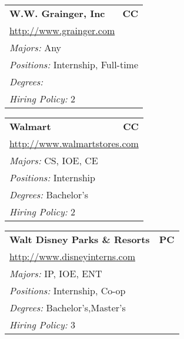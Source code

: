 \documentclass[twoside]{article}
\begin{document}
\begin{center}
\begin{multicols}{3}
\begin{FlushLeft}
\begin{minipage}{.9\columnwidth}
\end{minipage}
 
\begin{minipage}{.9\columnwidth}\begin{tabularx}{.95\columnwidth}{Xr}
                 {\Large\bf W.W. Grainger, Inc} & {\Large\bf CC}\\
    \multicolumn{2}{p{.95\columnwidth}}{\url{http://www.grainger.com}}\\
    \multicolumn{2}{p{.95\columnwidth}}{\emph{Majors:} Any}\\
    \multicolumn{2}{p{.95\columnwidth}}{\emph{Positions:} Internship, Full-time}\\
    \multicolumn{2}{p{.95\columnwidth}}{\emph{Degrees:} }\\
    \multicolumn{2}{p{.95\columnwidth}}{\emph{Hiring Policy:} 2}\\
    \end{tabularx}
    
\end{minipage}
 
\begin{minipage}{.9\columnwidth}\begin{tabularx}{.95\columnwidth}{Xr}
                 {\Large\bf Walmart} & {\Large\bf CC}\\
    \multicolumn{2}{p{.95\columnwidth}}{\url{http://www.walmartstores.com}}\\
    \multicolumn{2}{p{.95\columnwidth}}{\emph{Majors:} CS, IOE, CE}\\
    \multicolumn{2}{p{.95\columnwidth}}{\emph{Positions:} Internship}\\
    \multicolumn{2}{p{.95\columnwidth}}{\emph{Degrees:} Bachelor's}\\
    \multicolumn{2}{p{.95\columnwidth}}{\emph{Hiring Policy:} 2}\\
    \end{tabularx}
    
\end{minipage}
 
\begin{minipage}{.9\columnwidth}\begin{tabularx}{.95\columnwidth}{Xr}
                 {\Large\bf Walt Disney Parks \& Resorts} & {\Large\bf PC}\\
    \multicolumn{2}{p{.95\columnwidth}}{\url{http://www.disneyinterns.com}}\\
    \multicolumn{2}{p{.95\columnwidth}}{\emph{Majors:} IP, IOE, ENT}\\
    \multicolumn{2}{p{.95\columnwidth}}{\emph{Positions:} Internship, Co-op}\\
    \multicolumn{2}{p{.95\columnwidth}}{\emph{Degrees:} Bachelor's,Master's}\\
    \multicolumn{2}{p{.95\columnwidth}}{\emph{Hiring Policy:} 3}\\
    \end{tabularx}
    

\end{minipage}
\end{FlushLeft}
\end{multicols}
\end{center}
\end{document}
